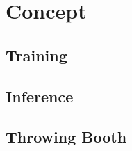 \chapter{Concept}
\label{ch:concept}


\section{Training}
\label{sec:training}


\section{Inference}
\label{sec:inference}


\section{Throwing Booth}
\label{sec:throwing_booth}

